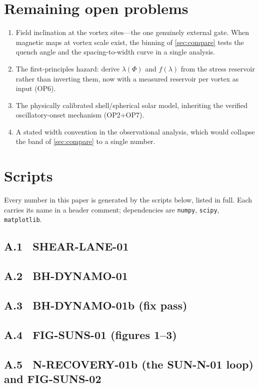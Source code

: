 \documentclass[11pt]{article}
\renewcommand{\S}{\mathhexbox278}
\theoremstyle{definition}
\theoremstyle{remark}
\begin{document}
\section{Remaining open problems}
\begin{enumerate}
\item Field inclination at the vortex sites---the one genuinely external
gate. When magnetic maps at vortex scale exist, the binning of
\S\ref{sec:compare} tests the quench angle and the spacing-to-width curve in
a single analysis.
\item The first-principles hazard: derive $\lambda(\Phi)$ and $f(\lambda)$
from the stress reservoir rather than inverting them, now with a measured
reservoir per vortex as input (OP6).
\item The physically calibrated shell/spherical solar model, inheriting the
verified oscillatory-onset mechanism (OP2+OP7).
\item A stated width convention in the observational analysis, which would
collapse the band of \S\ref{sec:compare} to a single number.
\end{enumerate}

\appendix
\section{Scripts}
Every number in this paper is generated by the scripts below, listed in full.
Each carries its name in a header comment; dependencies are \texttt{numpy},
\texttt{scipy}, \texttt{matplotlib}.

\subsection*{A.1 \ SHEAR-LANE-01}

\subsection*{A.2 \ BH-DYNAMO-01}

\subsection*{A.3 \ BH-DYNAMO-01b (fix pass)}

\subsection*{A.4 \ FIG-SUNS-01 (figures 1--3)}

\subsection*{A.5 \ N-RECOVERY-01b (the SUN-N-01 loop) and FIG-SUNS-02}


\end{document}
